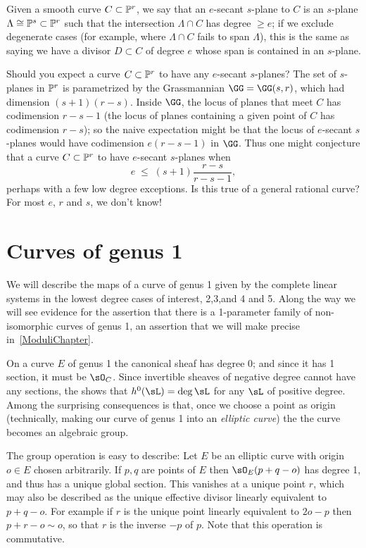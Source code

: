 Given a smooth curve $C \subset \PP^r$, we say that an $e$-secant $s$-plane to $C$ is an $s$-plane $\Lambda \cong \PP^s \subset \PP^r$ such that the intersection $\Lambda \cap C$ has degree $\geq e$; if we exclude degenerate cases (for example, where $\Lambda \cap C$ fails to span $\Lambda$), this is the same as saying we have a divisor $D \subset C$ of degree $e$ whose span is contained in an $s$-plane.

Should you expect a curve $C \subset \PP^r$ to have any $e$-secant $s$-planes? The set of $s$-planes in $\PP^r$ is parametrized by the Grassmannian $\GG = \GG(s,r)$, which had dimension $(s+1)(r-s)$. Inside $\GG$, the locus of planes that meet $C$ has codimension $r-s-1$ (the locus of planes containing a given point of $C$ has codimension $r-s$); so the naive expectation might be that the locus of $e$-secant $s$-planes would have codimension $e(r-s-1)$ in $\GG$. Thus one might conjecture that a curve $C \subset \PP^r$ to have $e$-secant $s$-planes when 
$$
e \; \leq \; (s+1)\frac{r-s}{r-s-1},
$$
perhaps with a few low degree exceptions. Is this true of a general rational curve? For most $e$, $r$ and $s$, we don't know!

\section{Curves of genus 1}

We will describe the maps of a curve of genus 1 given by
the complete linear systems in the lowest degree cases of interest, 2,3,and 4 and 5. Along the
way we will see evidence for the assertion that there is a 1-parameter family of non-isomorphic
curves of genus 1, an assertion that we will make precise in~\ref{ModuliChapter}.


On a curve $E$ of genus 1 the canonical sheaf has degree 0; and since it has 1 section, it must be $\sO_C$.
Since invertible sheaves of negative degree cannot have any sections, the \trr shows that
$h^0( \sL) = \deg \sL$ for any $\sL$ of positive degree. Among the surprising consequences is that, once we choose a point as 
origin (technically, making our curve of genus 1 into an \emph{elliptic curve}) the  the curve becomes
an algebraic group. 

The group operation is easy to describe:
Let $E$ be an elliptic curve with origin $o\in E$ chosen arbitrarily. If $p,q$ are points of $E$ then $\sO_E(p+q-o)$ has degree 1, and
thus has a unique global section. This vanishes at a unique point $r$, which may also be described as the unique
effective divisor linearly equivalent to $p+q-o$. For example if $r$ is the  unique point
linearly equivalent to $2o-p$ then $p+r-o\sim o$, so that $r$ is the inverse $-p$ of $p$. Note that this operation is commutative.


